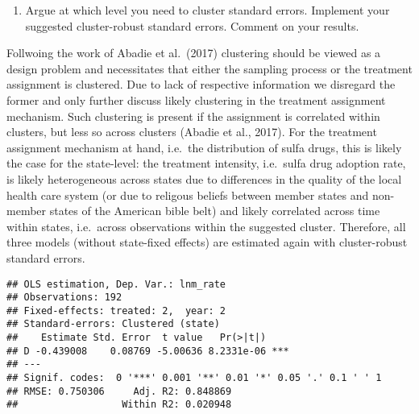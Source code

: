 \documentclass[
]{article}
\newenvironment{Shaded}{\begin{snugshade}}{\end{snugshade}}
\newcommand{\AttributeTok}[1]{\textcolor[rgb]{0.77,0.63,0.00}{#1}}
\newcommand{\DecValTok}[1]{\textcolor[rgb]{0.00,0.00,0.81}{#1}}
\newcommand{\FunctionTok}[1]{\textcolor[rgb]{0.00,0.00,0.00}{#1}}
\newcommand{\NormalTok}[1]{#1}
\newcommand{\OtherTok}[1]{\textcolor[rgb]{0.56,0.35,0.01}{#1}}
\newcommand{\SpecialCharTok}[1]{\textcolor[rgb]{0.00,0.00,0.00}{#1}}
\newcommand{\StringTok}[1]{\textcolor[rgb]{0.31,0.60,0.02}{#1}}
\providecommand{\tightlist}{%
  \setlength{\itemsep}{0pt}\setlength{\parskip}{0pt}}
\begin{document}
\begin{enumerate}
\def\labelenumi{\roman{enumi})}
\setcounter{enumi}{5}
\tightlist
\item
  Argue at which level you need to cluster standard errors. Implement
  your suggested cluster-robust standard errors. Comment on your
  results.
\end{enumerate}

Follwoing the work of Abadie et al.~(2017) clustering should be viewed
as a design problem and necessitates that either the sampling process or
the treatment assignment is clustered. Due to lack of respective
information we disregard the former and only further discuss likely
clustering in the treatment assignment mechanism. Such clustering is
present if the assignment is correlated within clusters, but less so
across clusters (Abadie et al., 2017). For the treatment assignment
mechanism at hand, i.e.~the distribution of sulfa drugs, this is likely
the case for the state-level: the treatment intensity, i.e.~sulfa drug
adoption rate, is likely heterogeneous across states due to differences
in the quality of the local health care system (or due to religous
beliefs between member states and non-member states of the American
bible belt) and likely correlated across time within states, i.e.~across
observations within the suggested cluster. Therefore, all three models
(without state-fixed effects) are estimated again with cluster-robust
standard errors.

\begin{Shaded}
\end{Shaded}

\begin{verbatim}
## OLS estimation, Dep. Var.: lnm_rate
## Observations: 192 
## Fixed-effects: treated: 2,  year: 2
## Standard-errors: Clustered (state) 
##    Estimate Std. Error  t value   Pr(>|t|)    
## D -0.439008    0.08769 -5.00636 8.2331e-06 ***
## ---
## Signif. codes:  0 '***' 0.001 '**' 0.01 '*' 0.05 '.' 0.1 ' ' 1
## RMSE: 0.750306     Adj. R2: 0.848869
##                  Within R2: 0.020948
\end{verbatim}
\end{document}
